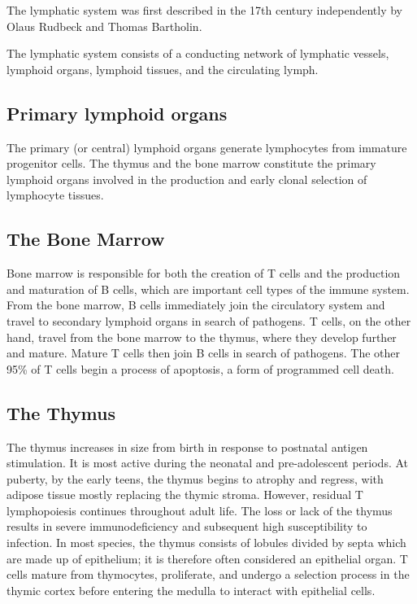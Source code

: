 The lymphatic system was first described in the 17th century independently by Olaus Rudbeck and Thomas Bartholin.

The lymphatic system consists of a conducting network of lymphatic vessels, lymphoid organs, lymphoid tissues, and the circulating lymph.

\hypertarget{primary-lymphoid-organs}{%
\subsection{Primary lymphoid organs}\label{primary-lymphoid-organs}}

The primary (or central) lymphoid organs generate lymphocytes from immature progenitor cells. The thymus and the bone marrow constitute the primary lymphoid organs involved in the production and early clonal selection of lymphocyte tissues.

\hypertarget{the-bone-marrow}{%
\subsection{The Bone Marrow}\label{the-bone-marrow}}

Bone marrow is responsible for both the creation of T cells and the production and maturation of B cells, which are important cell types of the immune system. From the bone marrow, B cells immediately join the circulatory system and travel to secondary lymphoid organs in search of pathogens. T cells, on the other hand, travel from the bone marrow to the thymus, where they develop further and mature. Mature T cells then join B cells in search of pathogens. The other 95\% of T cells begin a process of apoptosis, a form of programmed cell death.

\hypertarget{the-thymus}{%
\subsection{The Thymus}\label{the-thymus}}

The thymus increases in size from birth in response to postnatal antigen stimulation. It is most active during the neonatal and pre-adolescent periods. At puberty, by the early teens, the thymus begins to atrophy and regress, with adipose tissue mostly replacing the thymic stroma. However, residual T lymphopoiesis continues throughout adult life. The loss or lack of the thymus results in severe immunodeficiency and subsequent high susceptibility to infection. In most species, the thymus consists of lobules divided by septa which are made up of epithelium; it is therefore often considered an epithelial organ. T cells mature from thymocytes, proliferate, and undergo a selection process in the thymic cortex before entering the medulla to interact with epithelial cells.



